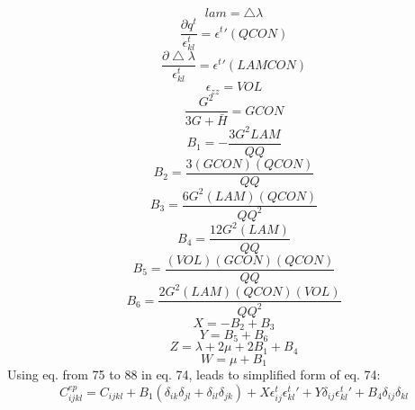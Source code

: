 \documentclass{article}
\begin{document}
\begin{equation}
    lam=\bigtriangleup\lambda
\end{equation}
\begin{equation}
    \frac{\partial q^{t}}{\epsilon^{t}_{kl}}=\epsilon^{t}\prime (QCON)
\end{equation}
\begin{equation}
    \frac{\partial \bigtriangleup\lambda}{\epsilon^{t}_{kl}}=\epsilon^{t}\prime(LAMCON)
\end{equation}
\begin{equation}
    \epsilon_{zz}=VOL
\end{equation}
\begin{equation}
    \frac{G^{2}}{3G+\bar{H}}=GCON
\end{equation}
\begin{equation}
    B_{1}=-\frac{3G^{2} LAM}{QQ}
\end{equation}
\begin{equation}
    B_{2}=\frac{3(GCON)(QCON)}{QQ}
\end{equation}
\begin{equation}
    B_{3}=\frac{6G^{2}(LAM)(QCON)}{QQ^{2}}
\end{equation}
\begin{equation}
    B_{4}=\frac{12G^{2}(LAM)}{QQ}
\end{equation}
\begin{equation}
    B_{5}=\frac{(VOL)(GCON)(QCON)}{QQ}
\end{equation}
\begin{equation}
    B_{6}=\frac{2G^{2}(LAM)(QCON)(VOL)}{QQ^{2}}
\end{equation}
\begin{equation}
    X=-B_{2}+B_{3}
\end{equation}
\begin{equation}
    Y=B_{5}+B_{6}
\end{equation}
\begin{equation}
    Z=\lambda+2\mu +2B_{1}+B_{4}
\end{equation}
\begin{equation}
    W=\mu + B_{1}
\end{equation}
Using eq. from 75 to 88 in eq. 74, leads to simplified form of eq. 74:
\begin{equation}
    C^{ep}_{ijkl}=C_{ijkl}+B_{1}(\delta_{ik}\delta_{jl}+\delta_{il}\delta_{jk}) +X\epsilon^{t}_{ij}\epsilon^{t}_{kl}\prime +Y\delta_{ij}\epsilon^{t}_{kl}\prime +B_{4}\delta_{ij}\delta_{kl}
\end{equation}
\end{document}
